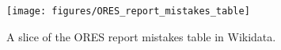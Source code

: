\begin{figure}[h]
  \centering
  \texttt{[image: figures/ORES\_report\_mistakes\_table]}
  \caption{A slice of the ORES report mistakes table in Wikidata.}
  \label{fig:ores_report_mistakes}
\end{figure}
